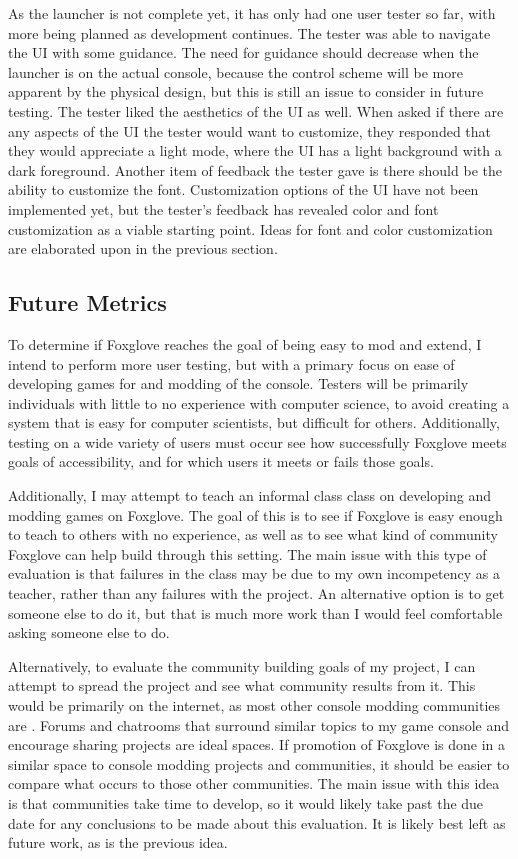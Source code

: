 \documentclass[10pt,twocolumn]{article}
\begin{document}
As the launcher is not complete yet, it has only had one user tester so far,
with more being planned as development continues. The tester was able to
navigate the UI with some guidance. The need for guidance should decrease when
the launcher is on the actual console, because the control scheme will be more
apparent by the physical design, but this is still an issue to consider in
future testing. The tester liked the aesthetics of the UI as well. When asked
if there are any aspects of the UI the tester would want to customize, they
responded that they would appreciate a light mode, where the UI has a light
background with a dark foreground. Another item of feedback the tester gave is
there should be the ability to customize the font. Customization options of the
UI have not been implemented yet, but the tester's feedback has revealed color
and font customization as a viable starting point. Ideas for font and color
customization are elaborated upon in the previous section.

\subsection{Future Metrics}

To determine if Foxglove reaches the goal of being easy to mod and
extend, I intend to perform more user testing, but with a primary focus on ease
of developing games for and modding of the console. Testers will be primarily
individuals with little to no experience with computer science, to avoid
creating a system that is easy for computer scientists,
but difficult for others. Additionally, testing on a wide variety of users must
occur see how successfully Foxglove meets goals of accessibility, and
for which users it meets or fails those goals.

Additionally, I may attempt to teach an informal class
class on developing and modding games on Foxglove. The goal of this is
to see if Foxglove is easy enough to teach to others with no
experience, as well as to see what kind of community Foxglove can help
build through this setting. The main issue with this type of evaluation is that
failures in the class may be due to my own incompetency as a teacher, rather
than any failures with the project. An alternative option is to get someone else
to do it, but that is much more work than I would feel comfortable asking
someone else to do.

Alternatively, to evaluate the community building goals of my project, I can
attempt to spread the project and see what community results from it. This would
be primarily on the internet, as most other console modding communities are
\cite{brown_why_2022}. Forums and chatrooms that surround similar topics to my
game console and encourage sharing projects are ideal spaces. If promotion of
Foxglove is done in a similar space to console modding projects and
communities, it should be easier to compare what occurs to those other
communities. The main issue with this idea is that communities take time to
develop, so it would likely take past the due date for any conclusions to be
made about this evaluation. It is likely best left as future work, as is the
previous idea.
\end{document}
